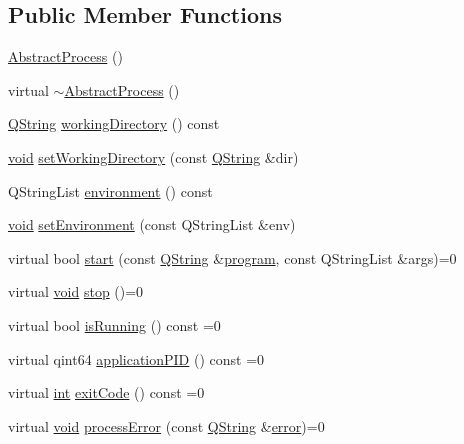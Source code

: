\subsection*{Public Member Functions}
\begin{DoxyCompactItemize}
\item 
\hyperlink{class_utils_1_1_abstract_process_aa48196443b6c83e4f7ac9e9a983151b6}{Abstract\-Process} ()
\item 
virtual \hyperlink{class_utils_1_1_abstract_process_ac53a8f5624f2508148fe9c709afdb7f0}{$\sim$\-Abstract\-Process} ()
\item 
\hyperlink{group___u_a_v_objects_plugin_gab9d252f49c333c94a72f97ce3105a32d}{Q\-String} \hyperlink{class_utils_1_1_abstract_process_a4f422dcea1db794d9d3286d4bd9f4468}{working\-Directory} () const 
\item 
\hyperlink{group___u_a_v_objects_plugin_ga444cf2ff3f0ecbe028adce838d373f5c}{void} \hyperlink{class_utils_1_1_abstract_process_a833a637aaa7be2df12fa7ab860b5c7b3}{set\-Working\-Directory} (const \hyperlink{group___u_a_v_objects_plugin_gab9d252f49c333c94a72f97ce3105a32d}{Q\-String} \&dir)
\item 
Q\-String\-List \hyperlink{class_utils_1_1_abstract_process_abc313189a56ab986759b69c77d47029f}{environment} () const 
\item 
\hyperlink{group___u_a_v_objects_plugin_ga444cf2ff3f0ecbe028adce838d373f5c}{void} \hyperlink{class_utils_1_1_abstract_process_a0cb9aafb2824d30c9fab6dfc8bc783bd}{set\-Environment} (const Q\-String\-List \&env)
\item 
virtual bool \hyperlink{class_utils_1_1_abstract_process_a34a319d7ea11064e1f595e765cdfbe63}{start} (const \hyperlink{group___u_a_v_objects_plugin_gab9d252f49c333c94a72f97ce3105a32d}{Q\-String} \&\hyperlink{glext_8h_ab55c179cd6c84b3f5ddc11d9da0f55b4}{program}, const Q\-String\-List \&args)=0
\item 
virtual \hyperlink{group___u_a_v_objects_plugin_ga444cf2ff3f0ecbe028adce838d373f5c}{void} \hyperlink{class_utils_1_1_abstract_process_aa1d7135cf34e1fc0c33b439a84249a14}{stop} ()=0
\item 
virtual bool \hyperlink{class_utils_1_1_abstract_process_a9c1a33eec47d4f5620792cb72ec9ef1d}{is\-Running} () const =0
\item 
virtual qint64 \hyperlink{class_utils_1_1_abstract_process_a436803fdf47816df0198d446ff1331ac}{application\-P\-I\-D} () const =0
\item 
virtual \hyperlink{ioapi_8h_a787fa3cf048117ba7123753c1e74fcd6}{int} \hyperlink{class_utils_1_1_abstract_process_af2d4da0de5edcb38eac2c483188bcafb}{exit\-Code} () const =0
\item 
virtual \hyperlink{group___u_a_v_objects_plugin_ga444cf2ff3f0ecbe028adce838d373f5c}{void} \hyperlink{class_utils_1_1_abstract_process_ab07e7c39b59327b2d9f4843e56fb8f57}{process\-Error} (const \hyperlink{group___u_a_v_objects_plugin_gab9d252f49c333c94a72f97ce3105a32d}{Q\-String} \&\hyperlink{uavobjecttemplate_8m_ae37d8f40ba76a59d04a674d824e8721f}{error})=0
\end{DoxyCompactItemize}
